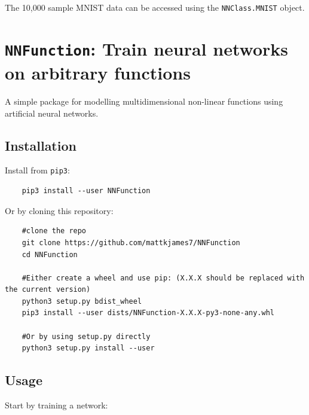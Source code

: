 	The 10,000 sample MNIST data can be accessed using the \texttt{NNClass.MNIST} object.
	

	\section{\texttt{NNFunction}: Train neural networks on arbitrary functions}

	A simple package for modelling multidimensional non-linear functions using artificial neural networks.

	\subsection{Installation}
	
	Install from \texttt{pip3}:
	
	\begin{verbatim}
	pip3 install --user NNFunction
	\end{verbatim}
	
	Or by cloning this repository:
	
	\begin{verbatim}
	#clone the repo
	git clone https://github.com/mattkjames7/NNFunction
	cd NNFunction
	
	#Either create a wheel and use pip: (X.X.X should be replaced with the current version)
	python3 setup.py bdist_wheel
	pip3 install --user dists/NNFunction-X.X.X-py3-none-any.whl
	
	#Or by using setup.py directly
	python3 setup.py install --user
	\end{verbatim}
	
	
	\subsection{Usage}
	
	Start by training a network:
	
